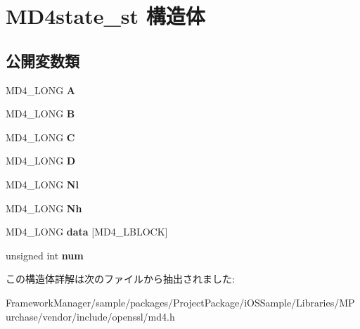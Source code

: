 \hypertarget{struct_m_d4state__st}{}\section{M\+D4state\+\_\+st 構造体}
\label{struct_m_d4state__st}
\subsection*{公開変数類}
\begin{DoxyCompactItemize}
\item 
\hypertarget{struct_m_d4state__st_a9573434688a6578764e83cf2c3ea5d20}{}M\+D4\+\_\+\+L\+O\+N\+G {\bfseries A}\label{struct_m_d4state__st_a9573434688a6578764e83cf2c3ea5d20}

\item 
\hypertarget{struct_m_d4state__st_aa04cb7f782726f8ab6d9e78fc4b93f63}{}M\+D4\+\_\+\+L\+O\+N\+G {\bfseries B}\label{struct_m_d4state__st_aa04cb7f782726f8ab6d9e78fc4b93f63}

\item 
\hypertarget{struct_m_d4state__st_a9397abcee77c8bdfdbb2d47fc448e486}{}M\+D4\+\_\+\+L\+O\+N\+G {\bfseries C}\label{struct_m_d4state__st_a9397abcee77c8bdfdbb2d47fc448e486}

\item 
\hypertarget{struct_m_d4state__st_ac918583b54dc234e97953a32ac0ae97f}{}M\+D4\+\_\+\+L\+O\+N\+G {\bfseries D}\label{struct_m_d4state__st_ac918583b54dc234e97953a32ac0ae97f}

\item 
\hypertarget{struct_m_d4state__st_a7f97311bae9341a6566991805a529f38}{}M\+D4\+\_\+\+L\+O\+N\+G {\bfseries Nl}\label{struct_m_d4state__st_a7f97311bae9341a6566991805a529f38}

\item 
\hypertarget{struct_m_d4state__st_a8a0b1c520fc5b0eaeb310263694a46f8}{}M\+D4\+\_\+\+L\+O\+N\+G {\bfseries Nh}\label{struct_m_d4state__st_a8a0b1c520fc5b0eaeb310263694a46f8}

\item 
\hypertarget{struct_m_d4state__st_a7d723771095f8b3e5404cc5833603551}{}M\+D4\+\_\+\+L\+O\+N\+G {\bfseries data} \mbox{[}M\+D4\+\_\+\+L\+B\+L\+O\+C\+K\mbox{]}\label{struct_m_d4state__st_a7d723771095f8b3e5404cc5833603551}

\item 
\hypertarget{struct_m_d4state__st_ae7e35fdee3a693c34c4322b00e9a9541}{}unsigned int {\bfseries num}\label{struct_m_d4state__st_ae7e35fdee3a693c34c4322b00e9a9541}

\end{DoxyCompactItemize}


この構造体詳解は次のファイルから抽出されました\+:\begin{DoxyCompactItemize}
\item 
Framework\+Manager/sample/packages/\+Project\+Package/i\+O\+S\+Sample/\+Libraries/\+M\+Purchase/vendor/include/openssl/md4.\+h\end{DoxyCompactItemize}
